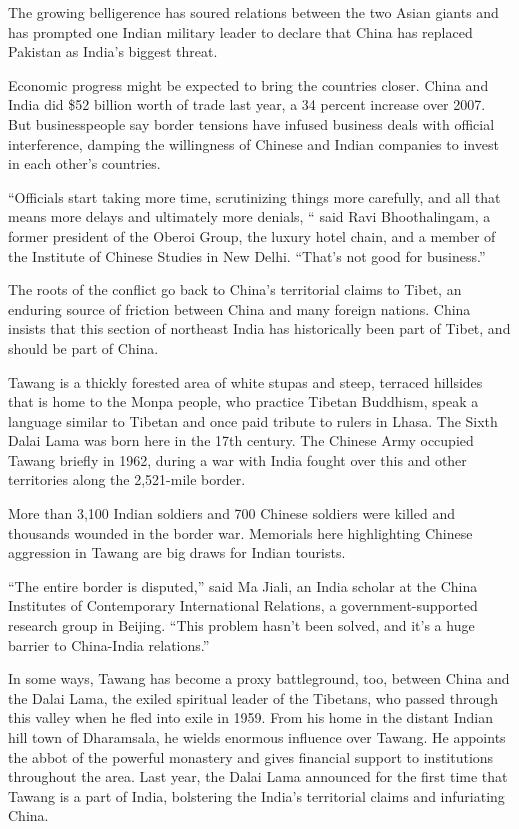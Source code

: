 ﻿\documentclass[12pt]{article}
\begin{document}
The growing belligerence has soured relations between the two Asian giants and has prompted one
Indian military leader to declare that China has replaced Pakistan as India's biggest threat.

Economic progress might be expected to bring the countries closer. China and India did \$52 billion
worth of trade last year, a 34 percent increase over 2007. But businesspeople say border tensions
have infused business deals with official interference, damping the willingness of Chinese and
Indian companies to invest in each other's countries.

``Officials start taking more time, scrutinizing things more carefully, and all that means more
delays and ultimately more denials, `` said Ravi Bhoothalingam, a former president of the Oberoi
Group, the luxury hotel chain, and a member of the Institute of Chinese Studies in New Delhi.
``That's not good for business.''

The roots of the conflict go back to China's territorial claims to Tibet, an enduring source of
friction between China and many foreign nations. China insists that this section of northeast India
has historically been part of Tibet, and should be part of China.

Tawang is a thickly forested area of white stupas and steep, terraced hillsides that is home to the
Monpa people, who practice Tibetan Buddhism, speak a language similar to Tibetan and once paid
tribute to rulers in Lhasa. The Sixth Dalai Lama was born here in the 17th century. The Chinese Army
occupied Tawang briefly in 1962, during a war with India fought over this and other territories
along the 2,521-mile border.

More than 3,100 Indian soldiers and 700 Chinese soldiers were killed and thousands wounded in the
border war. Memorials here highlighting Chinese aggression in Tawang are big draws for Indian
tourists.

``The entire border is disputed,'' said Ma Jiali, an India scholar at the China Institutes of
Contemporary International Relations, a government-supported research group in Beijing. ``This
problem hasn't been solved, and it's a huge barrier to China-India relations.''

In some ways, Tawang has become a proxy battleground, too, between China and the Dalai Lama, the
exiled spiritual leader of the Tibetans, who passed through this valley when he fled into exile in
1959. From his home in the distant Indian hill town of Dharamsala, he wields enormous influence over
Tawang. He appoints the abbot of the powerful monastery and gives financial support to institutions
throughout the area. Last year, the Dalai Lama announced for the first time that Tawang is a part of
India, bolstering the India's territorial claims and infuriating China.
\end{document}
